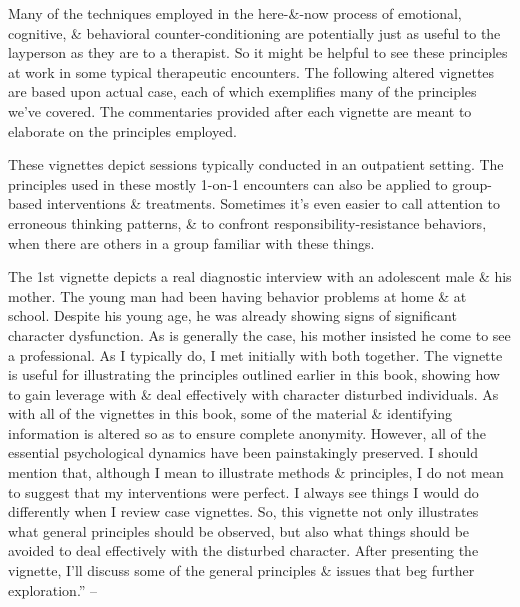 \documentclass{article}
\numberwithin{equation}{section}
\begin{document}
Many of the techniques employed in the here-\&-now process of emotional, cognitive, \& behavioral counter-conditioning are potentially just as useful to the layperson as they are to a therapist. So it might be helpful to see these principles at work in some typical therapeutic encounters. The following altered vignettes are based upon actual case, each of which exemplifies many of the principles we've covered. The commentaries provided after each vignette are meant to elaborate on the principles employed.

These vignettes depict sessions typically conducted in an outpatient setting. The principles used in these mostly 1-on-1 encounters can also be applied to group-based interventions \& treatments. Sometimes it's even easier to call attention to erroneous thinking patterns, \& to confront responsibility-resistance behaviors, when there are others in a group familiar with these things.

The 1st vignette depicts a real diagnostic interview with an adolescent male \& his mother. The young man had been having behavior problems at home \& at school. Despite his young age, he was already showing signs of significant character dysfunction. As is generally the case, his mother insisted he come to see a professional. As I typically do, I met initially with both together. The vignette is useful for illustrating the principles outlined earlier in this book, showing how to gain leverage with \& deal effectively with character disturbed individuals. As with all of the vignettes in this book, some of the material \& identifying information is altered so as to ensure complete anonymity. However, all of the essential psychological dynamics have been painstakingly preserved. I should mention that, although I mean to illustrate methods \& principles, I do not mean to suggest that my interventions were perfect. I always see things I would do differently when I review case vignettes. So, this vignette not only illustrates what general principles should be observed, but also what things should be avoided to deal effectively with the disturbed character. After presenting the vignette, I'll discuss some of the general principles \& issues that beg further exploration.'' -- \cite[pp. 207--210]{Simon2011}
\end{document}
